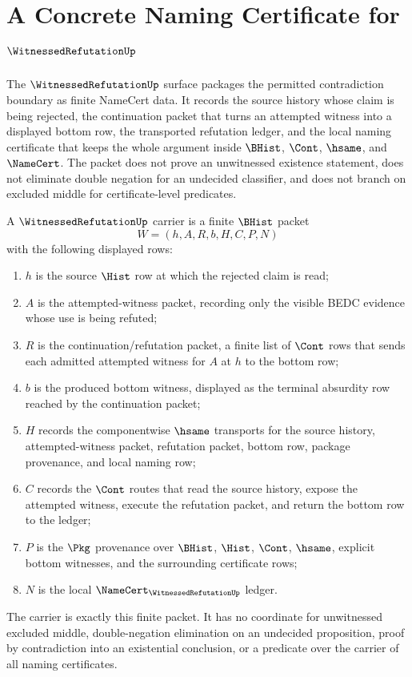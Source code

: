 \chapter{A Concrete Naming Certificate for $\WitnessedRefutationUp$}
\label{ch:concrete-instances-witnessedrefutation-namecert}

The $\WitnessedRefutationUp$ surface packages the permitted contradiction boundary as finite NameCert data. It records the source history whose claim is being rejected, the continuation packet that turns an attempted witness into a displayed bottom row, the transported refutation ledger, and the local naming certificate that keeps the whole argument inside $\BHist$, $\Cont$, $\hsame$, and $\NameCert$. The packet does not prove an unwitnessed existence statement, does not eliminate double negation for an undecided classifier, and does not branch on excluded middle for certificate-level predicates.

\begin{definition}
\label{def:witnessed-refutation-carrier}
A $\WitnessedRefutationUp$ carrier is a finite $\BHist$ packet
$$
W=(h,A,R,b,H,C,P,N)
$$
with the following displayed rows:
\begin{enumerate}
\item $h$ is the source $\Hist$ row at which the rejected claim is read;
\item $A$ is the attempted-witness packet, recording only the visible BEDC evidence whose use is being refuted;
\item $R$ is the continuation/refutation packet, a finite list of $\Cont$ rows that sends each admitted attempted witness for $A$ at $h$ to the bottom row;
\item $b$ is the produced bottom witness, displayed as the terminal absurdity row reached by the continuation packet;
\item $H$ records the componentwise $\hsame$ transports for the source history, attempted-witness packet, refutation packet, bottom row, package provenance, and local naming row;
\item $C$ records the $\Cont$ routes that read the source history, expose the attempted witness, execute the refutation packet, and return the bottom row to the ledger;
\item $P$ is the $\Pkg$ provenance over $\BHist$, $\Hist$, $\Cont$, $\hsame$, explicit bottom witnesses, and the surrounding certificate rows;
\item $N$ is the local $\NameCert_{\WitnessedRefutationUp}$ ledger.
\end{enumerate}
The carrier is exactly this finite packet. It has no coordinate for unwitnessed excluded middle, double-negation elimination on an undecided proposition, proof by contradiction into an existential conclusion, or a predicate over the carrier of all naming certificates.
\end{definition}

